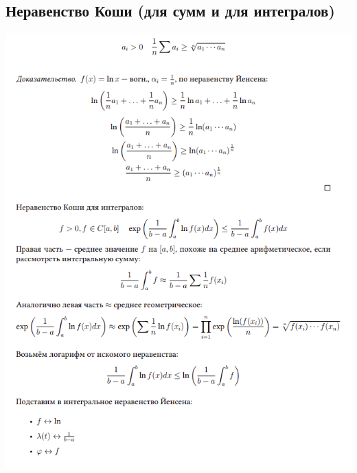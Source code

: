 \documentclass[../main.tex]{subfiles}
\begin{document}
\subsection{Неравенство Коши (для сумм и для интегралов)}
\includegraphics[scale = 1]{Images/2.37.png}
\newpage
\end{document}
